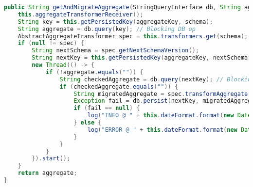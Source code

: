 \begin{lstlisting}[language=Java, label={mget}, caption={Metode for håndtering av GET-spørring i Migrator.}]
public String getAndMigrateAggregate(StringQueryInterface db, String aggregateKey, String schema) {
    this.aggregateTransformerReceiver();
    String key = this.getPersistedKey(aggregateKey, schema);
    String aggregate = db.query(key); // Blocking DB op
    AbstractAggregateTransformer spec = this.transformers.get(schema);
    if (null != spec) {
        String nextSchema = spec.getNextSchemaVersion();
        String nextKey = this.getPersistedKey(aggregateKey, nextSchema);
        new Thread(() -> {
            if (!aggregate.equals("")) {
                String checkedAggregate = db.query(nextKey); // Blocking DB op
                if (checkedAggregate.equals("")) {
                    String migratedAggregate = spec.transformAggregate(aggregate);
                    Exception fail = db.persist(nextKey, migratedAggregate); // Blocking DB op
                    if (fail == null) {
                        log("INFO @ " + this.dateFormat.format(new Date()) + " - Migrated aggregate with key " + key + " to " + nextKey + "\n");
                    } else {
                        log("ERROR @ " + this.dateFormat.format(new Date()) + " - Error during migration from " + key + " to " + nextKey + ":\n" + fail.toString() + "\n");
                    }
                }
            }
        }).start();
    }
    return aggregate;
}
\end{lstlisting}
